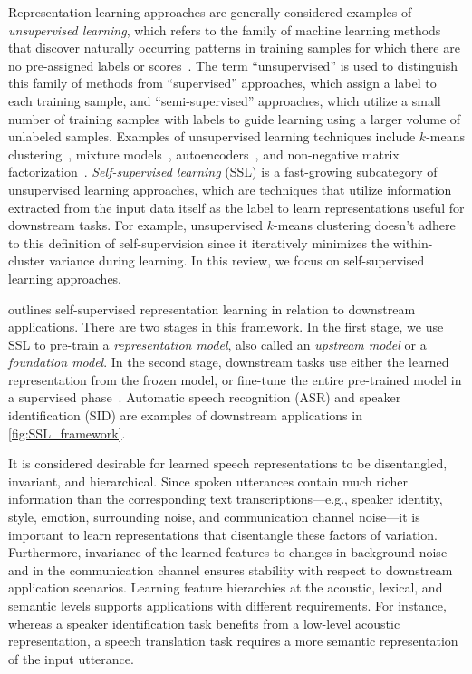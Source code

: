 Representation learning approaches are generally considered examples of \textit{unsupervised
learning}, which refers to the family of machine learning methods that discover
naturally occurring patterns in training samples for which there are no pre-assigned
labels or scores~\cite{jordan_machine_2015}. 
The term ``unsupervised'' is used to distinguish this family of methods from
``supervised'' approaches, which assign a label to each training sample, and
``semi-supervised'' approaches, which utilize a small number of training samples
with labels to guide learning using a larger volume of unlabeled samples.
Examples of unsupervised learning techniques include $k$-means clustering~\cite{gray_vector_1984}, mixture models~\cite{jordan_hierarchical_1994}, autoencoders~\cite{hinton_autoencoders_1994},
and non-negative matrix factorization~\cite{lee_learning_1999}. 
\textit{Self-supervised learning} (SSL) is a fast-growing subcategory of
unsupervised learning approaches, which are techniques that utilize
information extracted from the input data itself as the label to learn
representations useful for 
downstream tasks. {\color{black} For example, unsupervised $k$-means clustering doesn't adhere to this definition of self-supervision since it iteratively minimizes the within-cluster variance during learning.}
In this review, we
focus on self-supervised learning approaches.

 outlines self-supervised representation learning in
relation to downstream applications. 
There are two stages in this framework.
In the first stage, we use SSL to pre-train a \textit{representation model},
also called an \textit{upstream model} or a \textit{foundation model}.
In the second stage, downstream tasks use either the learned
representation from the frozen model, or fine-tune the entire pre-trained model
in a supervised phase~\cite{hinton_reducing_2006}. 
Automatic speech recognition (ASR) and speaker identification (SID) are 
examples of downstream applications in \cref{fig:SSL_framework}.

It is considered desirable for learned speech representations to be
disentangled, invariant, and hierarchical.
Since spoken utterances contain much richer information than the corresponding text
transcriptions---e.g., speaker identity, style, emotion, surrounding noise, and
communication channel noise---it is important to learn representations that
disentangle these factors of variation. Furthermore, invariance of the learned
features to changes in background noise and in the communication channel ensures
stability with respect to downstream application scenarios. Learning feature
hierarchies at the acoustic, lexical, and semantic levels supports applications
with different requirements. For instance, whereas a speaker identification task
benefits from a low-level acoustic representation, a speech
translation task requires a more semantic representation of the input
utterance. 

